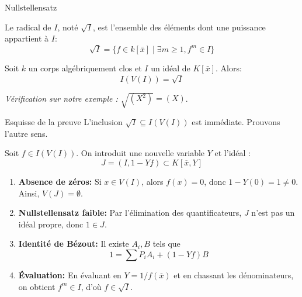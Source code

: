 \documentclass{beamer}
\begin{document}
\begin{frame}{Nullstellensatz}
    \begin{definition}
        Le radical de $I$, noté $\sqrt{I}$, est l'ensemble des éléments dont une puissance appartient à $I$:
        \[ \sqrt{I} = \{ f \in k[\bar{x}] \mid \exists m \ge 1, f^m \in I \} \]
    \end{definition}

    \pause
    \begin{theorem}
        Soit $k$ un corps algébriquement clos et $I$ un idéal de $K[\bar{x}]$. Alors:
        \[ I(V(I)) = \sqrt{I} \]
    \end{theorem}
    \pause
    \textit{Vérification sur notre exemple :} $\sqrt{(X^2)} = (X)$.
\end{frame}

\begin{frame}{Esquisse de la preuve}
    L'inclusion $\sqrt{I} \subseteq I(V(I))$ est immédiate. Prouvons l'autre sens.
    
    \pause
    \vspace{0.3cm}
    Soit $f \in I(V(I))$. On introduit une nouvelle variable $Y$ et l'idéal :
    \[ J = (I, 1 - Yf) \subset K[\overline{x}, Y] \]
    
    \pause
    \begin{enumerate}
        \item \textbf{Absence de zéros:} Si $x \in V(I)$, alors $f(x) = 0$, donc $1 - Y(0) = 1 \neq 0$. Ainsi, $V(J) = \emptyset$.
        
        \pause
        \item \textbf{Nullstellensatz faible:} Par l'élimination des quantificateurs, $J$ n'est pas un idéal propre, donc $1 \in J$.
        
        \pause
        \item \textbf{Identité de Bézout:} Il existe $A_i, B$ tels que 
        \[ 1 = \sum P_i A_i + (1-Yf)B \]
        \pause
        \item \textbf{Évaluation:} En évaluant en $Y = 1/f(\overline{x})$ et en chassant les dénominateurs, on obtient $f^m \in I$, d'où $f \in \sqrt{I}$.
    \end{enumerate}
\end{frame}
\end{document}

